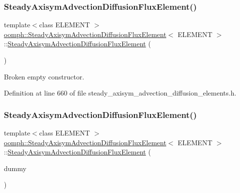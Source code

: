 \subsubsection{\texorpdfstring{Steady\+Axisym\+Advection\+Diffusion\+Flux\+Element()}{SteadyAxisymAdvectionDiffusionFluxElement()}\hspace{0.1cm}{\footnotesize\ttfamily [2/3]}}
{\footnotesize\ttfamily template$<$class E\+L\+E\+M\+E\+NT $>$ \\
\hyperlink{classoomph_1_1SteadyAxisymAdvectionDiffusionFluxElement}{oomph\+::\+Steady\+Axisym\+Advection\+Diffusion\+Flux\+Element}$<$ E\+L\+E\+M\+E\+NT $>$\+::\hyperlink{classoomph_1_1SteadyAxisymAdvectionDiffusionFluxElement}{Steady\+Axisym\+Advection\+Diffusion\+Flux\+Element} (\begin{DoxyParamCaption}{ }\end{DoxyParamCaption})\hspace{0.3cm}{\ttfamily [inline]}}



Broken empty constructor. 



Definition at line 660 of file steady\+\_\+axisym\+\_\+advection\+\_\+diffusion\+\_\+elements.\+h.

\mbox{\label{classoomph_1_1SteadyAxisymAdvectionDiffusionFluxElement_a0baf681da17e525890c7115e87510aad}} 
\subsubsection{\texorpdfstring{Steady\+Axisym\+Advection\+Diffusion\+Flux\+Element()}{SteadyAxisymAdvectionDiffusionFluxElement()}\hspace{0.1cm}{\footnotesize\ttfamily [3/3]}}
{\footnotesize\ttfamily template$<$class E\+L\+E\+M\+E\+NT $>$ \\
\hyperlink{classoomph_1_1SteadyAxisymAdvectionDiffusionFluxElement}{oomph\+::\+Steady\+Axisym\+Advection\+Diffusion\+Flux\+Element}$<$ E\+L\+E\+M\+E\+NT $>$\+::\hyperlink{classoomph_1_1SteadyAxisymAdvectionDiffusionFluxElement}{Steady\+Axisym\+Advection\+Diffusion\+Flux\+Element} (\begin{DoxyParamCaption}\item[{const \hyperlink{classoomph_1_1SteadyAxisymAdvectionDiffusionFluxElement}{Steady\+Axisym\+Advection\+Diffusion\+Flux\+Element}$<$ E\+L\+E\+M\+E\+NT $>$ \&}]{dummy }\end{DoxyParamCaption})\hspace{0.3cm}{\ttfamily [inline]}}



